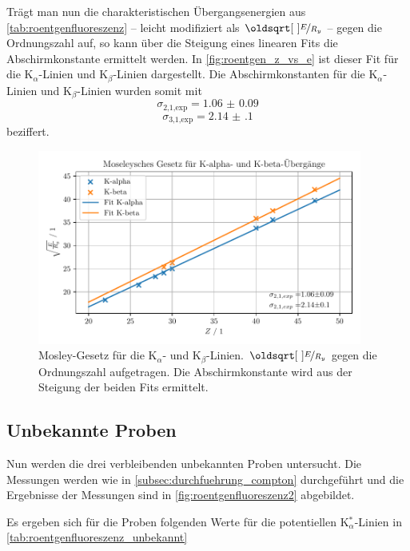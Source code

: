 \documentclass[ngerman]{scrartcl}
\begin{document}
%
Trägt man nun die charakteristischen Übergangsenergien aus \autoref{tab:roentgenfluoreszenz} -- leicht modifiziert als $\sqrt{\nicefrac{E}{R_y}}$ -- gegen die Ordnungszahl auf, so kann über die Steigung eines linearen Fits die Abschirmkonstante ermittelt werden. In \autoref{fig:roentgen_z_vs_e} ist dieser Fit für die K$_{\alpha}$-Linien und K$_{\beta}$-Linien dargestellt. Die Abschirmkonstanten für die K$_{\alpha}$-Linien und K$_{\beta}$-Linien wurden somit mit
\[\sigma_{\text{2,1,exp}} = \num{1.06(9)} \]
\[\sigma_{\text{3,1,exp}} = \num{2.14(10)}\]
beziffert.
%
\begin{figure}[H]
    \centering
    \begin{samepage}
        \includegraphics[width=0.95\textwidth]{../plots/roentgen_data_Z_vs_E.pdf}
        \caption[Mosley-Gesetz für die K$_{\alpha}$- und K$_{\beta}$-Linien.]{Mosley-Gesetz für die K$_{\alpha}$- und K$_{\beta}$-Linien. $\sqrt{\nicefrac{E}{R_y}}$ gegen die Ordnungszahl aufgetragen. Die Abschirmkonstante wird aus der Steigung der beiden Fits ermittelt.}
        \label{fig:roentgen_z_vs_e}
    \end{samepage}
\end{figure}


\subsection{Unbekannte Proben}
\label{sec:roentgen_unbekannt}

Nun werden die drei verbleibenden unbekannten Proben untersucht. Die Messungen werden wie in \autoref{subsec:durchfuehrung_compton} durchgeführt und die Ergebnisse der Messungen sind in \autoref{fig:roentgenfluoreszenz2} abgebildet. 

Es ergeben sich für die Proben folgenden Werte für die potentiellen K$_{\alpha}^*$-Linien in \autoref{tab:roentgenfluoreszenz_unbekannt}
\end{document}
